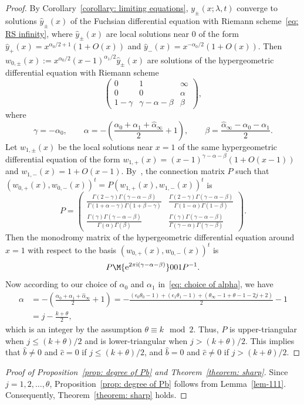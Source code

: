\begin{proof} By Corollary~\ref{corollary: limiting equations},
 $y_\pm(x;\lambda,t)$ converge to solutions $\hat y_\pm(x)$ of the
 Fuchsian differential equation with Riemann scheme~\eqref{eq: RS
 infinity}, where $\hat y_\pm(x)$ are local solutions near $0$ of
 the form $\hat y_+(x)=x^{\alpha_0/2+1}(1+O(x))$ and $\hat
 y_-(x)=x^{-\alpha_0/2}(1+O(x))$. Then
 $w_{0,\pm}(x):=x^{\alpha_0/2}(x-1)^{\alpha_1/2}\hat
 y_\pm(x)$ are solutions of the hypergeometric differential equation
 with Riemann scheme
\[
 \begin{pmatrix} 0 & 1 & \infty \\
 0 & 0 & \alpha \\
 1-\gamma & \gamma-\alpha-\beta & \beta\end{pmatrix},
\]
 where
\[
 \gamma=-\alpha_0, \qquad
 \alpha=-\left(\frac{\alpha_0+\alpha_1+\hat\alpha_\infty}2+1\right),
 \qquad
 \beta=\frac{\hat\alpha_\infty-\alpha_0-\alpha_1}2.
\]
 Let $w_{1,\pm}(x)$ be the local solutions near $x=1$ of the same
 hypergeometric differential equation of the form
 $w_{1,+}(x)=(x-1)^{\gamma-\alpha-\beta}(1+O(x-1))$ and
 $w_{1,-}(x)=1+O(x-1)$. By~\cite[Chapter~2, Theorem~4.7.1]{Yoshida}, the connection matrix $P$ such that
 $(w_{0,+}(x),w_{0,-}(x))^t=P{(w_{1,+}(x),w_{1,-}(x))^t}$ is
\[
 P=\begin{pmatrix}
 \displaystyle
 \frac{\Gamma(2-\gamma)\Gamma(\gamma-\alpha-\beta)}
 {\Gamma(1+\alpha-\gamma)\Gamma(1+\beta-\gamma)} &
 \displaystyle
 \frac{\Gamma(2-\gamma)\Gamma(\gamma-\alpha-\beta)}
 {\Gamma(1-\alpha)\Gamma(1-\beta)} \\[10pt]
 \displaystyle
 \frac{\Gamma(\gamma)\Gamma(\gamma-\alpha-\beta)}
 {\Gamma(\alpha)\Gamma(\beta)} &
 \displaystyle\frac{\Gamma(\gamma)\Gamma(\gamma-\alpha-\beta)}
 {\Gamma(\gamma-\alpha)\Gamma(\gamma-\beta)} \end{pmatrix}.
\]
 Then the monodromy matrix of the hypergeometric differential
 equation around $x=1$ with respect to the basis
 $(w_{0,+}(x),w_{0,-}(x))^t$ is
\[
 P\M{{\rm e}^{2\pi {\rm i}(\gamma-\alpha-\beta)}}001P^{-1}.
\]
 Now according to our choice of $\alpha_0$ and $\alpha_1$ in~\eqref{eq: choice of alpha}, we have
 \begin{align*}
 \alpha&{}=-\left(\frac{\alpha_0+\alpha_1+\hat\alpha_\infty}2
 +1\right)
=-\frac{(\epsilon_0\theta_0-1)+(\epsilon_1\theta_1-1)
 +(\theta_\infty-1+\theta-1-2j+2)}2-1 \\
 &{}=j-\frac{k+\theta}2,
 \end{align*}
 which is an integer by the assumption $\theta\equiv k\mod 2$.
 Thus, $P$ is upper-triangular when $j\le(k+\theta)/2$ and is
 lower-triangular when $j>(k+\theta)/2$. This implies that $\hat
 b\neq0$ and $\hat c=0$ if $j\le(k+\theta)/2$, and $\hat b=0$ and
 $\hat c\neq 0$ if $j>(k+\theta)/2$.
\end{proof}

\begin{proof}[Proof of Proposition~\ref{prop: degree of Pb} and Theorem~\ref{theorem: sharp}] Since $j=1,2,\dots, \theta$, Proposition~\ref{prop: degree of Pb} follows from Lemma~\ref{lem-111}. Consequently, Theorem~\ref{theorem: sharp} holds.
\end{proof}
